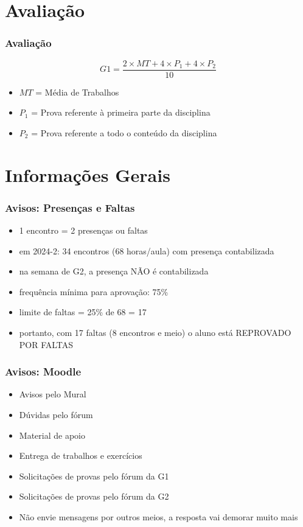 \documentclass[aspectratio=169]{beamer}
\begin{document}
\section{Avalia\c{c}\~ao}


\begin{frame}\frametitle{Avalia\c{c}\~ao}
\[
G1 = \frac{ 2 \times MT + 4 \times P_1 + 4 \times P_2}{10}
\]
\begin{itemize}
	\item $MT$ = Média de Trabalhos
 	\item $P_1$ = Prova referente à primeira parte da disciplina
	\item $P_2$ = Prova referente a todo o conteúdo da disciplina
\end{itemize}
\end{frame}

 

\section{Informa\c{c}\~oes Gerais}


\begin{frame}\frametitle{Avisos: Presenças e Faltas}
\begin{itemize}
	\item 1 encontro = 2 presen\c{c}as ou faltas
	\item em 2024-2: 34 encontros (68 horas/aula) com presença contabilizada
	\item na semana de G2, a presença NÃO é contabilizada
	\item frequ\^encia m\'inima para aprova\c{c}\~ao: 75\%
	\item limite de faltas = 25\% de 68 = 17
	\item portanto, com 17 faltas (8 encontros e meio) o aluno está REPROVADO POR FALTAS
\end{itemize}
\end{frame}

\begin{frame}\frametitle{Avisos: Moodle}
\begin{itemize}	
	\item Avisos pelo Mural
	\item D\'uvidas pelo f\'orum
	\item Material de apoio
	\item Entrega de trabalhos e exerc\'icios
	\item Solicitações de provas pelo fórum da G1 
	\item Solicitações de provas pelo fórum da G2 
    \item Não envie mensagens por outros meios, a resposta vai demorar muito mais
\end{itemize}
\end{frame}
\end{document}
